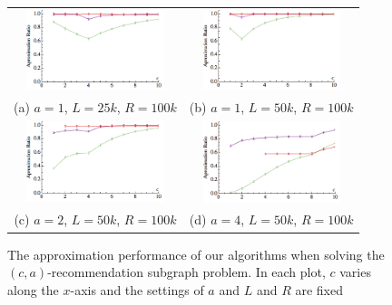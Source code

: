 \begin{figure}
\begin{tabular}{cc}
  \includegraphics[width=40mm]{images/l=25000,r=100000_Greedy_vs_Naive_error.png} &   \includegraphics[width=40mm]{images/l=50000,r=100000_Greedy_vs_Naive_error.png} \\
(a) $a=1$, $L=25k$, $R=100k$ & (b) $a=1$, $L=50k$, $R=100k$ \\[6pt]
 \includegraphics[width=40mm]{images/l=50000,r=100000,a=2_Greedy_vs_Naive_error.png} &   \includegraphics[width=40mm]{images/l=50000,r=100000,a=4_Greedy_vs_Naive_error.png}\\
(c) $a=2$, $L=50k$, $R=100k$ & (d) $a=4$, $L=50k$, $R=100k$ \\[6pt]
\end{tabular}
\caption{The approximation performance of our algorithms when solving the $(c,a)$-recommendation subgraph problem. In each plot, $c$ varies along the $x$-axis and the settings of $a$ and $L$ and $R$ are fixed}
\label{fig:sim_combo}
\end{figure}

